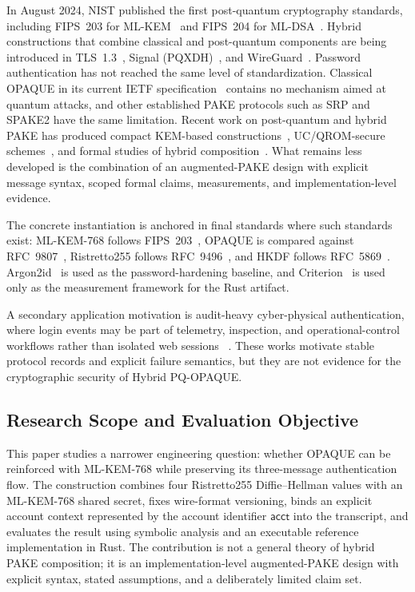 \documentclass[preprint,12pt]{elsarticle}
\newcommand{\acct}{\mathsf{acct}}
\theoremstyle{remark}
\begin{document}
In August 2024, NIST published the first post-quantum cryptography standards, including FIPS~203 for ML-KEM~\cite{fips203} and FIPS~204 for ML-DSA~\cite{fips204}. Hybrid constructions that combine classical and post-quantum components are being introduced in TLS~1.3~\cite{stebila2024}, Signal (PQXDH)~\cite{brendel2020}, and WireGuard~\cite{hulsing2021}. Password authentication has not reached the same level of standardization. Classical OPAQUE in its current IETF specification~\cite{ietf-opaque} contains no mechanism aimed at quantum attacks, and other established PAKE protocols such as SRP and SPAKE2 have the same limitation. Recent work on post-quantum and hybrid PAKE has produced compact KEM-based constructions~\cite{arriaga2024}, UC/QROM-secure schemes~\cite{lyu2024uc}, and formal studies of hybrid composition~\cite{hesse2024,lyu2024hybrid}. What remains less developed is the combination of an augmented-PAKE design with explicit message syntax, scoped formal claims, measurements, and implementation-level evidence.

The concrete instantiation is anchored in final standards where such
standards exist: ML-KEM-768 follows FIPS~203~\cite{fips203}, OPAQUE is
compared against RFC~9807~\cite{ietf-opaque}, Ristretto255 follows
RFC~9496~\cite{devalence2024}, and HKDF follows RFC~5869~\cite{krawczyk2010}.
Argon2id~\cite{biryukov2016} is used as the password-hardening baseline,
and Criterion~\cite{heyer2023} is used only as the measurement framework
for the Rust artifact.

A secondary application motivation is audit-heavy cyber-physical
authentication, where login events may be part of telemetry, inspection,
and operational-control workflows rather than isolated web sessions
~\cite{svystun2025dytam,svystun2024thermal,lysyi2025fire}. These works
motivate stable protocol records and explicit failure semantics, but they
are not evidence for the cryptographic security of Hybrid PQ-OPAQUE.

\subsection{Research Scope and Evaluation Objective}

This paper studies a narrower engineering question: whether OPAQUE can be reinforced with ML-KEM-768 while preserving its three-message authentication flow. The construction combines four Ristretto255 Diffie--Hellman values with an ML-KEM-768 shared secret, fixes wire-format versioning, binds an explicit account context represented by the account identifier $\acct$ into the transcript, and evaluates the result using symbolic analysis and an executable reference implementation in Rust. The contribution is not a general theory of hybrid PAKE composition; it is an implementation-level augmented-PAKE design with explicit syntax, stated assumptions, and a deliberately limited claim set.
\end{document}
